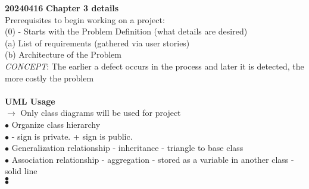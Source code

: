 \documentclass[11pt]{article}
\begin{document}
    \textbf{20240416}
    \textbf{Chapter 3 details}\\
    Prerequisites to begin working on a project:\\
    (0) - Starts with the Problem Definition (what details are desired)\\
    (a) List of requirements (gathered via user stories)\\
    (b) Architecture of the Problem\\
    

    \textit{CONCEPT}: The earlier a defect occurs in the process and later 
    it is detected, the more costly the problem\\
    \\
    \textbf{UML Usage}\\
    $\rightarrow$ Only class diagrams will be used for project\\
    \indent $\bullet$ Organize class hierarchy\\
    \indent $\bullet$ - sign is private. + sign is public.  \\
    \indent $\bullet$ Generalization relationship - inheritance - triangle to base class  \\
    \indent $\bullet$ Association relationship - aggregation - stored as a variable in another class - solid line  \\
    \indent $\bullet$   \\
    \indent $\bullet$   \\
\end{document}
